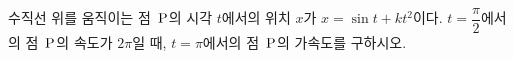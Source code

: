수직선 위를 움직이는 점~$\mathrm{P}$의 시각 $t$에서의 위치 $x$가 $x=\sin t+kt^2$이다. $t=\dfrac{\pi}{2}$에서의 점~$\mathrm{P}$의 속도가 $2\pi$일 때, $t=\pi$에서의 점~$\mathrm{P}$의 가속도를 구하시오. 
